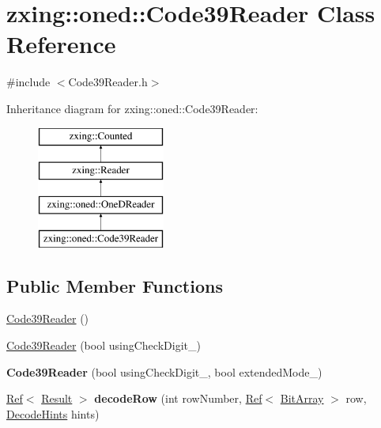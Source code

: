 \hypertarget{classzxing_1_1oned_1_1_code39_reader}{}\section{zxing\+:\+:oned\+:\+:Code39\+Reader Class Reference}
\label{classzxing_1_1oned_1_1_code39_reader}


{\ttfamily \#include $<$Code39\+Reader.\+h$>$}

Inheritance diagram for zxing\+:\+:oned\+:\+:Code39\+Reader\+:\begin{figure}[H]
\begin{center}
\leavevmode
\includegraphics[height=4.000000cm]{classzxing_1_1oned_1_1_code39_reader}
\end{center}
\end{figure}
\subsection*{Public Member Functions}
\begin{DoxyCompactItemize}
\item 
\mbox{\hyperlink{classzxing_1_1oned_1_1_code39_reader_a0690215eb4af5f6378aeed64f81e75b1}{Code39\+Reader}} ()
\item 
\mbox{\hyperlink{classzxing_1_1oned_1_1_code39_reader_ad003a8b2f37b92ff49b43263ea9c431c}{Code39\+Reader}} (bool using\+Check\+Digit\+\_\+)
\item 
\mbox{\label{classzxing_1_1oned_1_1_code39_reader_a31fd211a146c0aa6e0648255ceaebd2f}} 
{\bfseries Code39\+Reader} (bool using\+Check\+Digit\+\_\+, bool extended\+Mode\+\_\+)
\item 
\mbox{\label{classzxing_1_1oned_1_1_code39_reader_a6b7e65df503ebb993d1a71f5aa769812}} 
\mbox{\hyperlink{classzxing_1_1_ref}{Ref}}$<$ \mbox{\hyperlink{classzxing_1_1_result}{Result}} $>$ {\bfseries decode\+Row} (int row\+Number, \mbox{\hyperlink{classzxing_1_1_ref}{Ref}}$<$ \mbox{\hyperlink{classzxing_1_1_bit_array}{Bit\+Array}} $>$ row, \mbox{\hyperlink{classzxing_1_1_decode_hints}{Decode\+Hints}} hints)
\end{DoxyCompactItemize}
